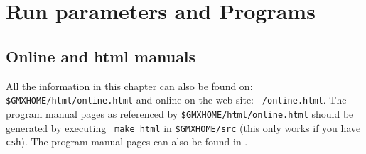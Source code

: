 \chapter{Run parameters and Programs}
\label{ch:programs}

\section{Online and html manuals}
All the information in this chapter can also be found on: {\tt
\$GMXHOME/html/online.html} and online on the {\gromacs} web site: {\tt
\wwwpage/online\gmxver.html}. The program manual pages as referenced by
{\tt \$GMXHOME/html/online.html} should be generated by executing {\tt
make html} in {\tt \$GMXHOME/src} (this only works if you have {\tt
csh}). The program manual pages can also be found in
.

\section{}


\section{}

